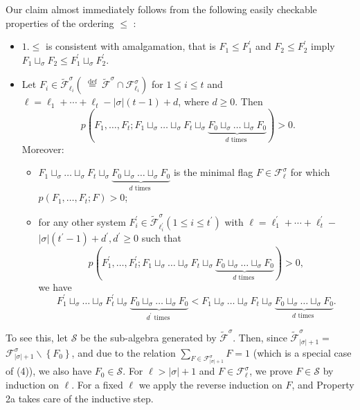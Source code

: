 \documentclass[10pt]{article}
\begin{document}
Our claim almost immediately follows from the following easily checkable properties of the ordering $\leq$ :

\begin{itemize}
  \item[] $1 . \leq$ is consistent with amalgamation, that is $F_{1} \leq F_{1}^{\prime}$ and $F_{2} \leq F_{2}^{\prime}$ imply $F_{1} \sqcup_{\sigma} F_{2} \leq F_{1}^{\prime} \sqcup_{\sigma} F_{2}^{\prime}$.
\end{itemize}

\begin{itemize}
  \item[2.] Let $F_{i} \in \widetilde{\mathcal{F}}_{\ell_{i}}^{\sigma}\left(\stackrel{\text { def }}{=} \widetilde{\mathcal{F}}^{\sigma} \cap \mathcal{F}_{\ell_{i}}^{\sigma}\right)$ for $1 \leq i \leq t$ and $\ell=\ell_{1}+\cdots+\ell_{t}-|\sigma|(t-1)+d$, where $d \geq 0$. Then
$$
p(F_{1}, \ldots, F_{t} ; F_{1} \sqcup_{\sigma} \ldots \sqcup_{\sigma} F_{t} \sqcup_{\sigma} \underbrace{F_{0} \sqcup_{\sigma} \ldots \sqcup_{\sigma} F_{0}}_{d \text { times }})>0 .
$$
Moreover:
  \begin{itemize}
    \item[(a)] $F_{1} \sqcup_{\sigma} \ldots \sqcup_{\sigma} F_{t} \sqcup_{\sigma} \underbrace{F_{0} \sqcup_{\sigma} \ldots \sqcup_{\sigma} F_{0}}_{d \text { times }}$ is the minimal flag $F \in \mathcal{F}_{\ell}^{\sigma}$ for which $p\left(F_{1}, \ldots, F_{t} ; F\right)>0$;
    \item[(b)] for any other system $F_{i}^{\prime} \in \widetilde{\mathcal{F}}_{\ell_{i}^{\prime}}^{\sigma}\left(1 \leq i \leq t^{\prime}\right)$ with $\ell=\ell_{1}^{\prime}+\cdots+\ell_{t}^{\prime}-$ $|\sigma|\left(t^{\prime}-1\right)+d^{\prime}, d^{\prime} \geq 0$ such that
$$
p(F_{1}^{\prime}, \ldots, F_{t}^{\prime} ; F_{1} \sqcup_{\sigma} \ldots \sqcup_{\sigma} F_{t} \sqcup_{\sigma} \underbrace{F_{0} \sqcup_{\sigma} \ldots \sqcup_{\sigma} F_{0}}_{d \text { times }})>0,
$$
we have
$$
F_{1}^{\prime} \sqcup_{\sigma} \ldots \sqcup_{\sigma} F_{t}^{\prime} \sqcup_{\sigma} \underbrace{F_{0} \sqcup_{\sigma} \ldots \sqcup_{\sigma} F_{0}}_{d^{\prime} \text { times }}<F_{1} \sqcup_{\sigma} \ldots \sqcup_{\sigma} F_{t} \sqcup_{\sigma} \underbrace{F_{0} \sqcup_{\sigma} \ldots \sqcup_{\sigma} F_{0}}_{d \text { times }} .
$$
  \end{itemize}
\end{itemize}

To see this, let $\mathcal{S}$ be the sub-algebra generated by $\widetilde{\mathcal{F}}^{\sigma}$. Then, since $\widetilde{\mathcal{F}}_{|\sigma|+1}^{\sigma}=$ $\mathcal{F}_{|\sigma|+1}^{\sigma} \backslash\left\{F_{0}\right\}$, and due to the relation $\sum_{F \in \mathcal{F}_{|\sigma|+1}^{\sigma}} F=1$ (which is a special case of (4)), we also have $F_{0} \in \mathcal{S}$. For $\ell>|\sigma|+1$ and $F \in \mathcal{F}_{\ell}^{\sigma}$, we prove $F \in \mathcal{S}$ by induction on $\ell$. For a fixed $\ell$ we apply the reverse induction on $F$, and Property 2a takes care of the inductive step.
\end{document}
